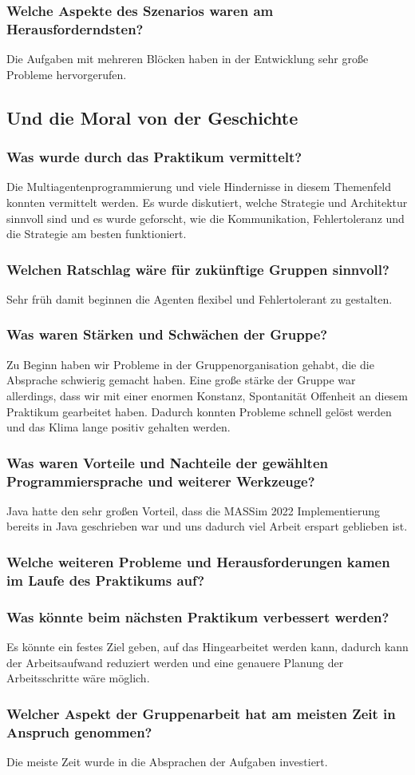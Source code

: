 \subsubsection{Welche Aspekte des Szenarios waren am Herausforderndsten?}
Die Aufgaben mit mehreren Blöcken haben in der Entwicklung sehr große Probleme hervorgerufen.
\subsection{Und die Moral von der Geschichte}
\subsubsection{Was wurde durch das Praktikum vermittelt?}
Die Multiagentenprogrammierung und viele Hindernisse in diesem Themenfeld konnten vermittelt werden. Es wurde diskutiert, welche Strategie und Architektur sinnvoll sind und es wurde geforscht, wie die Kommunikation, Fehlertoleranz und die Strategie am besten funktioniert.
\subsubsection{Welchen Ratschlag wäre für zukünftige Gruppen sinnvoll?}
Sehr früh damit beginnen die Agenten flexibel und Fehlertolerant zu gestalten.
\subsubsection{Was waren Stärken und Schwächen der Gruppe?}
Zu Beginn haben wir Probleme in der Gruppenorganisation gehabt, die die Absprache schwierig gemacht haben. Eine große stärke der Gruppe war allerdings, dass wir mit einer enormen Konstanz, Spontanität Offenheit an diesem Praktikum gearbeitet haben. Dadurch konnten Probleme schnell gelöst werden und das Klima lange positiv gehalten werden.
\subsubsection{Was waren Vorteile und Nachteile der gewählten Programmiersprache und weiterer Werkzeuge?}
Java hatte den sehr großen Vorteil, dass die MASSim 2022 Implementierung bereits in Java geschrieben war und uns dadurch viel Arbeit erspart geblieben ist.
\subsubsection{Welche weiteren Probleme und Herausforderungen kamen im Laufe des Praktikums auf?}
\subsubsection{Was könnte beim nächsten Praktikum verbessert werden?}
Es könnte ein festes Ziel geben, auf das Hingearbeitet werden kann, dadurch kann der Arbeitsaufwand reduziert werden und eine genauere Planung der Arbeitsschritte wäre möglich.
\subsubsection{Welcher Aspekt der Gruppenarbeit hat am meisten Zeit in Anspruch genommen?}
Die meiste Zeit wurde in die Absprachen der Aufgaben investiert.
